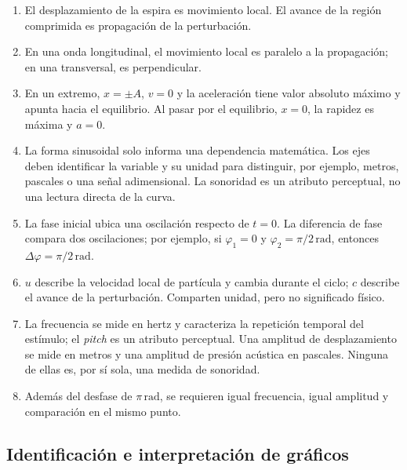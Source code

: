 \begin{enumerate}[label=\textbf{C\arabic*.},leftmargin=*]
    \item El desplazamiento de la espira es movimiento local. El avance de la
    región comprimida es propagación de la perturbación.

    \item En una onda longitudinal, el movimiento local es paralelo a la
    propagación; en una transversal, es perpendicular.

    \item En un extremo, \(x=\pm A\), \(v=0\) y la aceleración tiene valor
    absoluto máximo y apunta hacia el equilibrio. Al pasar por el equilibrio,
    \(x=0\), la rapidez es máxima y \(a=0\).

    \item La forma sinusoidal solo informa una dependencia matemática. Los
    ejes deben identificar la variable y su unidad para distinguir, por
    ejemplo, metros, pascales o una señal adimensional. La sonoridad es un
    atributo perceptual, no una lectura directa de la curva.

    \item La fase inicial ubica una oscilación respecto de \(t=0\). La
    diferencia de fase compara dos oscilaciones; por ejemplo, si
    \(\varphi_1=0\) y \(\varphi_2=\pi/2\,\text{rad}\), entonces
    \(\Delta\varphi=\pi/2\,\text{rad}\).

    \item \(u\) describe la velocidad local de partícula y cambia durante el
    ciclo; \(c\) describe el avance de la perturbación. Comparten unidad, pero
    no significado físico.

    \item La frecuencia se mide en hertz y caracteriza la repetición temporal
    del estímulo; el \emph{pitch} es un atributo perceptual. Una amplitud de
    desplazamiento se mide en metros y una amplitud de presión acústica en
    pascales. Ninguna de ellas es, por sí sola, una medida de sonoridad.

    \item Además del desfase de \(\pi\,\text{rad}\), se requieren igual
    frecuencia, igual amplitud y comparación en el mismo punto.
\end{enumerate}

\subsection*{Identificación e interpretación de gráficos}

